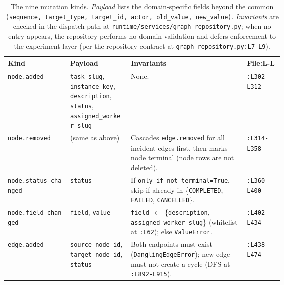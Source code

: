 \documentclass{article}
\begin{document}
\begin{table}[h]
\centering
\small
\caption{The nine mutation kinds. \emph{Payload} lists the
domain-specific fields beyond the common
\texttt{(sequence, target\_type, target\_id, actor,
old\_value, new\_value)}. \emph{Invariants} are checked in the
dispatch path at
\texttt{runtime/services/graph\_repository.py}; when no entry
appears, the repository performs no domain validation and
defers enforcement to the experiment layer (per the repository
contract at \texttt{graph\_repository.py:L7-L9}).}
\label{tab:mutations}
\footnotesize
\setlength{\tabcolsep}{3pt}
\begin{tabular}{@{}l>{\raggedright\arraybackslash}p{0.22\linewidth}>{\raggedright\arraybackslash}p{0.42\linewidth}l@{}}
\toprule
\textbf{Kind} & \textbf{Payload} & \textbf{Invariants} & \textbf{File:L-L} \\
\midrule
\texttt{node.added}            & \texttt{task\_slug}, \texttt{instance\_key}, \texttt{description}, \texttt{status}, \texttt{assigned\_worker\_slug} & None.                                                                                                                               & \texttt{:L302-L312} \\
\texttt{node.removed}          & (same as above)                                                                                             & Cascades \texttt{edge.removed} for all incident edges first, then marks node terminal (node rows are not deleted).                  & \texttt{:L314-L358} \\
\texttt{node.status\_changed}  & \texttt{status}                                                                                             & If \texttt{only\_if\_not\_terminal=True}, skip if already in \{\texttt{COMPLETED}, \texttt{FAILED}, \texttt{CANCELLED}\}.            & \texttt{:L360-L400} \\
\texttt{node.field\_changed}   & \texttt{field}, \texttt{value}                                                                              & \texttt{field}~$\in$~\{\texttt{description}, \texttt{assigned\_worker\_slug}\} (whitelist at \texttt{:L62}); else \texttt{ValueError}. & \texttt{:L402-L434} \\
\texttt{edge.added}            & \texttt{source\_node\_id}, \texttt{target\_node\_id}, \texttt{status}                                       & Both endpoints must exist (\texttt{DanglingEdgeError}); new edge must not create a cycle (DFS at \texttt{:L892-L915}).              & \texttt{:L438-L474} \\

\end{tabular}
\end{table}
\end{document}
